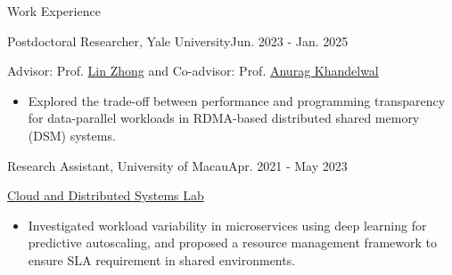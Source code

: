 \documentclass{resume} %
\begin{document}
\begin{rSection}{Work Experience}
\begin{rSubsection}{Postdoctoral Researcher, Yale University}{Jun. 2023 - Jan. 2025} {}{}
\item[]
  Advisor: Prof. \href{https://linzhong.org/}{Lin Zhong} and Co-advisor: Prof. \href{https://www.anuragkhandelwal.com/}{Anurag Khandelwal}
\begin{itemize}
  \item Explored the trade-off between performance and programming transparency for data-parallel workloads in RDMA-based distributed shared memory (DSM) systems.
\end{itemize}
\end{rSubsection}
\vspace{-0.5em}

\vspace{-0.5em}
\begin{rSubsection}{Research Assistant, University of Macau}{Apr. 2021 - May 2023} {}{}
\item[] 
\href{https://www.fst.um.edu.mo/personal/huanlexu/huanlexu-team/}{Cloud and Distributed Systems Lab}
\begin{itemize}
    \setlength{\itemsep}{0.2em}
    \setlength{\parskip}{0pt}
\item Investigated workload variability in microservices using deep learning for predictive autoscaling, and proposed a resource management framework to ensure SLA requirement in shared environments.
\end{itemize}
\end{rSubsection} 


\end{rSection}
\end{document}
